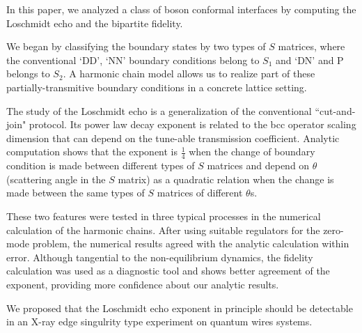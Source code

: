 
In this paper, we analyzed a class of boson conformal interfaces by computing the Loschmidt echo and the bipartite fidelity. 

We began by classifying the boundary states by two types of $S$ matrices, where the conventional `DD', `NN' boundary conditions belong to $S_1$ and  `DN' and P belongs to $S_2$. A harmonic chain model allows us to realize part of these partially-transmitive boundary conditions in a concrete lattice setting. 

The study of the Loschmidt echo is a generalization of the conventional ``cut-and-join" protocol. Its power law decay exponent is related to the bcc operator scaling dimension that can depend on the tune-able transmission coefficient. Analytic computation shows that the exponent is $\frac{1}{4}$ when the change of boundary condition is made between different types of $S$ matrices and depend on $\theta$ (scattering angle in the $S$ matrix) as a quadratic relation when the change is made between the same types of $S$ matrices of different $\theta$s.

These two features were tested in three typical processes in the numerical calculation of the harmonic chains. After using suitable regulators for the zero-mode problem, the numerical results agreed with the analytic calculation within error. Although tangential to the non-equilibrium dynamics, the fidelity calculation was used as a diagnostic tool and shows better agreement of the exponent, providing more confidence about our analytic results. 

We proposed that the Loschmidt echo exponent in principle should be detectable in an X-ray edge singulrity type experiment on quantum wires systems. 



